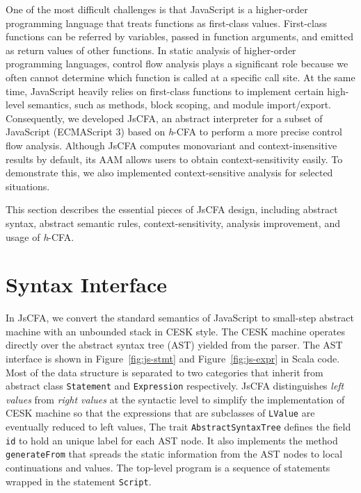 \documentclass[12pt]{report}
\begin{document}
One of the most difficult challenges is that JavaScript is a higher-order programming language that treats functions as first-class values. First-class functions can be referred by variables, passed in function arguments, and emitted as return values of other functions.
In static analysis of higher-order programming languages, control flow analysis plays a significant role because we often cannot determine which function is called at a specific call site.
At the same time, JavaScript heavily relies on first-class functions to implement certain high-level semantics, such as methods, block scoping, and module import/export.
Consequently, we developed JsCFA, an abstract interpreter for a subset of JavaScript (ECMAScript 3) based on \textit{h}-CFA to perform a more precise control flow analysis.
Although JsCFA computes monovariant and context-insensitive results by default, its AAM allows users to obtain context-sensitivity easily.
To demonstrate this, we also implemented context-sensitive analysis for selected situations.

This section describes the essential pieces of JsCFA design, including abstract syntax, abstract semantic rules, context-sensitivity, analysis improvement, and usage of \textit{h}-CFA\@.

\section{Syntax Interface}
\label{sub:Syntax}

In JsCFA, we convert the standard semantics of JavaScript to small-step abstract machine with an unbounded stack in CESK style.
The CESK machine operates directly over the abstract syntax tree (AST) yielded from the parser.
The AST interface is shown in Figure~\ref{fig:js-stmt} and Figure~\ref{fig:js-expr} in Scala code.
Most of the data structure is separated to two categories that inherit from abstract class \verb|Statement| and \verb|Expression| respectively.
JsCFA distinguishes \emph{left values} from \emph{right values} at the syntactic level to simplify the implementation of CESK machine so that the expressions that are subclasses of \verb|LValue| are eventually reduced to left values,
The trait \verb|AbstractSyntaxTree| defines the field \verb|id| to hold an unique label for each AST node.
It also implements the method \verb|generateFrom| that spreads the static information from the AST nodes to
local continuations and values.
The top-level program is a sequence of statements wrapped in the statement \verb|Script|.
\end{document}
